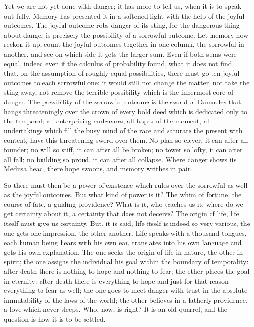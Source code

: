 \documentclass[12pt,a4paper,openany]{book}
\newcommand{\opage}[1]{\marginnote{\footnotesize\textit{[#1]}}}
\begin{document}
Yet we are not yet done with danger; it has more to tell us, when it is to speak out fully. Memory
has presented it in a softened light with the help of the joyful outcomes. The joyful outcome robs
danger of its sting, for the dangerous thing about danger is precisely the possibility of a
sorrowful outcome. Let memory now reckon it up, count the joyful outcomes together in one column, the
sorrowful in another, and see on which side it gets the larger sum. Even if both sums were equal,
indeed even if the calculus of probability found, what it does not find, that, on the assumption of
roughly equal possibilities, there must go ten joyful outcomes to each sorrowful one: it would still
not change the matter, not take the sting away, not remove the terrible possibility which is the
innermost core of danger. The possibility of the sorrowful outcome is the sword of Damocles that
hangs threateningly over the crown of every bold deed which is dedicated only to the temporal; all
enterprising endeavors, all hopes of the moment, all undertakings which fill the busy mind of the
race and saturate the present with content, have this threatening sword over them. No plan so
clever, it can after all founder; no will so stiff, it can after all be broken; no tower so lofty,
it can after all fall; no building so proud, it can after all collapse. Where danger shows its
Medusa head, there hope swoons, and memory writhes in pain.

So there must then be a power of existence which rules over the sorrowful as well as the joyful
outcomes. But what kind of power is it? The
\setcounter{footnote}{0}%
\opage{10}whim of fortune, the course of fate, a guiding providence? What is it, who teaches us it,
where do we get certainty about it, a certainty that does not deceive? The origin of life, life
itself must give us certainty. But, it is said, life itself is indeed so very various, the one gets
one impression, the other another. Life speaks with a thousand tongues, each human being hears with
his own ear, translates into his own language and gets his own explanation. The one seeks the origin
of life in nature, the other in spirit; the one assigns the individual his goal within the boundary
of temporality: after death there is nothing to hope and nothing to fear; the other places the goal
in eternity: after death there is everything to hope and just for that reason everything to fear as
well; the one goes to meet danger with trust in the absolute immutability of the laws of the world;
the other believes in a fatherly providence, a love which never sleeps. Who, now, is right? It is an
old quarrel, and the question is how it is to be settled.
\end{document}
